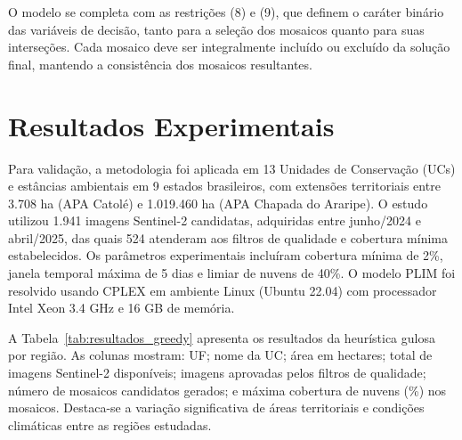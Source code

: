 \documentclass[a4paper,11pt]{article}
\begin{document}
O modelo se completa com as restrições (8) e (9), que definem o caráter binário das variáveis de decisão, tanto para a seleção dos mosaicos quanto para suas interseções. Cada mosaico deve ser integralmente incluído ou excluído da solução final, mantendo a consistência dos mosaicos resultantes.
\vspace{-7mm}

\section{Resultados Experimentais}
\vspace{-4mm}
Para validação, a metodologia foi aplicada em 13 Unidades de Conservação (UCs) e estâncias
ambientais em 9 estados brasileiros, com extensões territoriais entre 3.708 ha (APA Catolé) e
1.019.460 ha (APA Chapada do Araripe). O estudo utilizou 1.941 imagens Sentinel-2 candidatas, adquiridas entre junho/2024 e abril/2025, das quais 524 atenderam aos filtros de qualidade e cobertura mínima estabelecidos. 
Os parâmetros experimentais incluíram cobertura mínima de 2\%, janela temporal máxima de 5 dias e limiar de
nuvens de 40\%. O modelo PLIM foi resolvido usando CPLEX em ambiente Linux (Ubuntu 22.04) com processador Intel Xeon 3.4 GHz e 16 GB de memória. 

A Tabela~\ref{tab:resultados_greedy} apresenta os resultados da heurística gulosa por região. As colunas mostram: UF; nome da UC; área em hectares; total de imagens Sentinel-2 disponíveis; imagens aprovadas pelos filtros de qualidade; número de mosaicos candidatos gerados; e máxima cobertura de nuvens (\%) nos mosaicos. Destaca-se a variação significativa de áreas territoriais e condições climáticas entre as regiões estudadas.
\setlength{\LTcapwidth}{\textwidth}
\setlength{\LTleft}{0pt}
\setlength{\LTright}{0pt}
\end{document}
